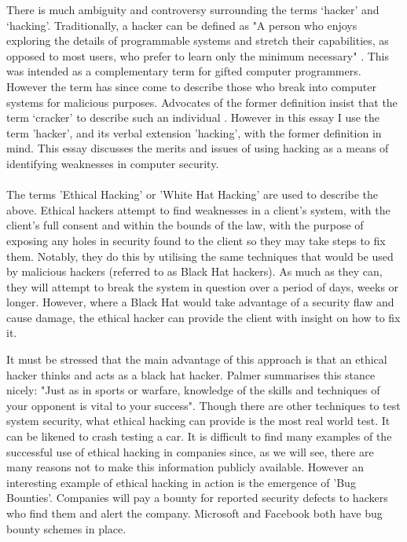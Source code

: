 \documentclass{article}
\begin{document}
There is much ambiguity and controversy surrounding the terms `hacker' and `hacking'. Traditionally, a hacker can be defined as "A person who enjoys exploring the details of programmable systems and stretch their capabilities, as opposed to most users, who prefer to learn only the minimum necessary" \cite[pg.~339-340]{HackersDictionary}. This was intended as a complementary term for gifted computer programmers. However the term has since come to describe those who break into computer systems for malicious purposes. Advocates of the former definition insist that the term `cracker' to describe such an individual \cite[pg.~400]{HackersDictionary}\cite[pg.~1]{HackingAndCyberCrime}\cite[pg.~1-2]{PalmerEthicalHacking}. However in this essay I use the term 'hacker', and its verbal extension 'hacking', with the former definition in mind. This essay discusses the merits and issues of using hacking as a means of identifying weaknesses in computer security.\\
\\

The terms 'Ethical Hacking' or 'White Hat Hacking' are used to describe the above. Ethical hackers attempt to find weaknesses in a client's system, with the client's full consent and within the bounds of the law, with the purpose of exposing any holes in security found to the client so they may take steps to fix them\cite[pg.~1]{HackingTeaching}. Notably, they do this by utilising the same techniques that would be used by malicious hackers (referred to as Black Hat hackers\cite[pg.~1-2]{HackingTeaching}). As much as they can, they will attempt to break the system in question over a period of days, weeks or longer. However, where a Black Hat would take advantage of a security flaw and cause damage, the ethical hacker can provide the client with insight on how to fix it.

It must be stressed that the main advantage of this approach is that an ethical hacker thinks and acts as a black hat hacker. Palmer summarises this stance nicely: "Just as in sports or warfare, knowledge of the skills and techniques of your opponent is vital to your success". Though there are other techniques to test system security, what ethical hacking can provide is the most real world test. It can be likened to crash testing a car. It is difficult to find many examples of the successful use of ethical hacking in companies since, as we will see, there are many reasons not to make this information publicly available. However an interesting example of ethical hacking in action is the emergence of 'Bug Bounties'. Companies will pay a bounty for reported security defects to hackers who find them and alert the company. Microsoft \cite{MicrosoftBugBounty} and Facebook \cite{FacebookBugBounty} both have bug bounty schemes in place.\\
\end{document}
